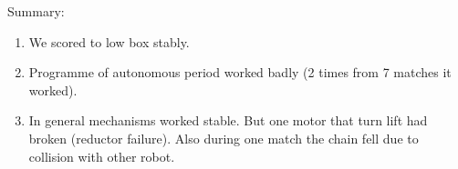 Summary:
\begin{enumerate}
	\item We scored to low box stably.
	
	\item Programme of autonomous period worked badly (2 times from 7 matches it worked).
	
	\item In general mechanisms worked stable. But one motor that turn lift had broken (reductor failure). Also during one match the chain fell due to collision with other robot.
\end{enumerate}
\fillpage
